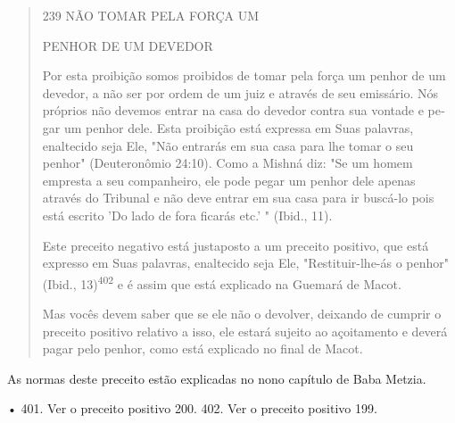 \begin{quote}
239 NÃO TOMAR PELA FORÇA UM

PENHOR DE UM DEVEDOR

Por esta proibição somos proibidos de tomar pela força um penhor de um
devedor, a não ser por ordem de um juiz e através de seu emissário. Nós
próprios não devemos entrar na casa do devedor contra sua vontade e
pe­gar um penhor dele. Esta proibição está expressa em Suas palavras,
enaltecido seja Ele, "Não entrarás em sua casa para lhe tomar o seu
penhor" (Deuteronô­mio 24:10). Como a Mishná diz: "Se um homem empresta
a seu companheiro, ele pode pegar um penhor dele apenas através do
Tribunal e não deve entrar em sua casa para ir buscá-lo pois está
escrito 'Do lado de fora ficarás etc.' " (Ibid., 11).

Este preceito negativo está justaposto a um preceito positivo, que está
expresso em Suas palavras, enaltecido seja Ele, "Restituir-lhe-ás o
penhor" (Ibid., 13)\textsuperscript{402} e é assim que está explicado na
Guemará de Macot.

Mas vocês devem saber que se ele não o devolver, deixando de cum­prir o
preceito positivo relativo a isso, ele estará sujeito ao açoitamento e
deve­rá pagar pelo penhor, como está explicado no final de Macot.
\end{quote}

As normas deste preceito estão explicadas no nono capítulo de Baba
Metzia.

• 401. Ver o preceito positivo 200. 402. Ver o preceito positivo 199.

